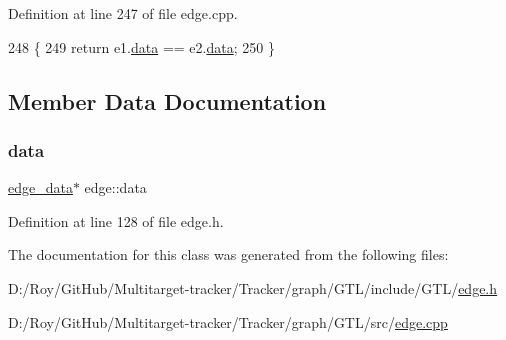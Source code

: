 Definition at line 247 of file edge.\+cpp.


\begin{DoxyCode}
248 \{
249     \textcolor{keywordflow}{return} e1.\mbox{\hyperlink{classedge_a0ebb6dfa28b77f47529085049352b436}{data}} == e2.\mbox{\hyperlink{classedge_a0ebb6dfa28b77f47529085049352b436}{data}};
250 \}
\end{DoxyCode}


\subsection{Member Data Documentation}
\mbox{\label{classedge_a0ebb6dfa28b77f47529085049352b436}} 
\subsubsection{\texorpdfstring{data}{data}}
{\footnotesize\ttfamily \mbox{\hyperlink{classedge__data}{edge\+\_\+data}}$\ast$ edge\+::data\hspace{0.3cm}{\ttfamily [private]}}



Definition at line 128 of file edge.\+h.



The documentation for this class was generated from the following files\+:\begin{DoxyCompactItemize}
\item 
D\+:/\+Roy/\+Git\+Hub/\+Multitarget-\/tracker/\+Tracker/graph/\+G\+T\+L/include/\+G\+T\+L/\mbox{\hyperlink{edge_8h}{edge.\+h}}\item 
D\+:/\+Roy/\+Git\+Hub/\+Multitarget-\/tracker/\+Tracker/graph/\+G\+T\+L/src/\mbox{\hyperlink{edge_8cpp}{edge.\+cpp}}\end{DoxyCompactItemize}
